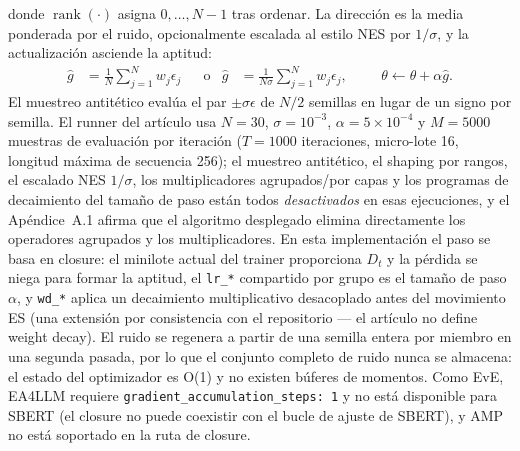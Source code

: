 donde $\operatorname{rank}(\cdot)$ asigna $0,\dots,N-1$ tras ordenar. La dirección es la media ponderada por el ruido, opcionalmente escalada al estilo NES por $1/\sigma$, y la actualización asciende la aptitud:
\begin{align}
\hat g &= \frac{1}{N}\sum_{j=1}^{N} w_j \epsilon_j
&&\text{o}&
\hat g &= \frac{1}{N\sigma}\sum_{j=1}^{N} w_j \epsilon_j,
&&&
\theta \leftarrow \theta + \alpha \hat g .
\end{align}
El muestreo antitético evalúa el par $\pm\sigma\epsilon$ de $N/2$ semillas en lugar de un signo por semilla. El runner del artículo usa $N = 30$, $\sigma = 10^{-3}$, $\alpha = 5\times 10^{-4}$ y $M = 5000$ muestras de evaluación por iteración ($T = 1000$ iteraciones, micro-lote 16, longitud máxima de secuencia 256); el muestreo antitético, el shaping por rangos, el escalado NES $1/\sigma$, los multiplicadores agrupados/por capas y los programas de decaimiento del tamaño de paso están todos \emph{desactivados} en esas ejecuciones, y el Apéndice~A.1 afirma que el algoritmo desplegado elimina directamente los operadores agrupados y los multiplicadores. En esta implementación el paso se basa en closure: el minilote actual del trainer proporciona $D_t$ y la pérdida se niega para formar la aptitud, el \texttt{lr\_*} compartido por grupo es el tamaño de paso $\alpha$, y \texttt{wd\_*} aplica un decaimiento multiplicativo desacoplado antes del movimiento ES (una extensión por consistencia con el repositorio --- el artículo no define weight decay). El ruido se regenera a partir de una semilla entera por miembro en una segunda pasada, por lo que el conjunto completo de ruido nunca se almacena: el estado del optimizador es O(1) y no existen búferes de momentos. Como EvE, EA4LLM requiere \texttt{gradient\_accumulation\_steps: 1} y no está disponible para SBERT (el closure no puede coexistir con el bucle de ajuste de SBERT), y AMP no está soportado en la ruta de closure.

